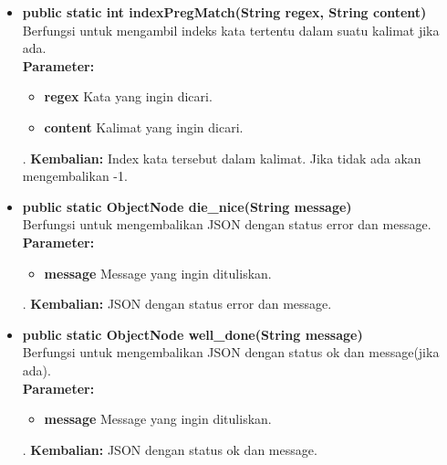 \begin{enumerate}
\begin{itemize}
		
		\item \textbf{public static int indexPregMatch(String regex, String content)}\\
		Berfungsi untuk mengambil indeks kata tertentu dalam suatu kalimat jika ada.\\
		\textbf{Parameter:}
				\begin{itemize}
					\item \textbf{regex} Kata yang ingin dicari.
					\item \textbf{content} Kalimat yang ingin dicari.
				\end{itemize}.
		\textbf{Kembalian:}  Index kata tersebut dalam kalimat. Jika tidak ada akan mengembalikan -1.
		
		\item \textbf{public static ObjectNode die\_nice(String message)}\\
		Berfungsi untuk mengembalikan JSON dengan status error dan message.\\
		\textbf{Parameter:}
				\begin{itemize}
					\item \textbf{message} Message yang ingin dituliskan.
				\end{itemize}.
		\textbf{Kembalian:}  JSON dengan status error dan message.
		
		\item \textbf{public static ObjectNode well\_done(String message)}\\
		Berfungsi untuk mengembalikan JSON dengan status ok dan message(jika ada).\\
		\textbf{Parameter:}
				\begin{itemize}
					\item \textbf{message} Message yang ingin dituliskan.
				\end{itemize}.
		\textbf{Kembalian:}  JSON dengan status ok dan message.
		

\end{itemize}
\end{enumerate}
